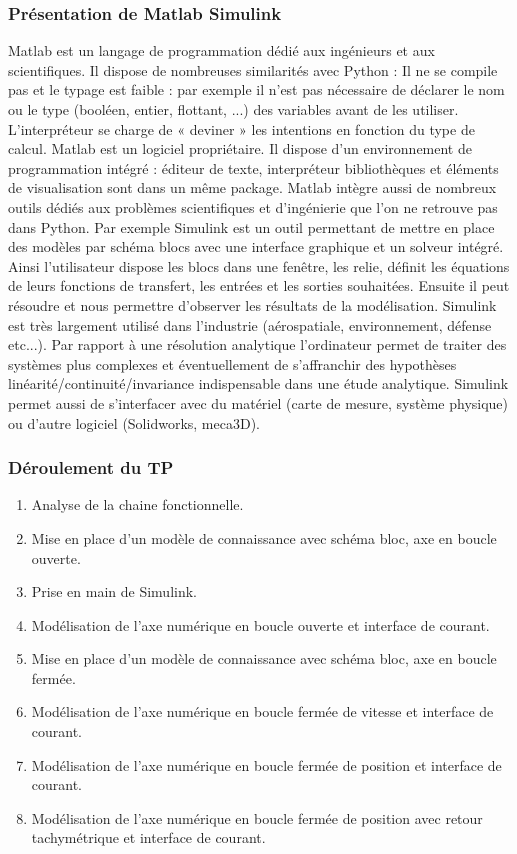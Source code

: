 \subsubsection{Présentation de Matlab Simulink}

Matlab est un langage de programmation dédié aux ingénieurs et aux scientifiques. Il dispose de nombreuses similarités avec Python : Il ne se compile pas et le typage est faible : par exemple il n'est pas nécessaire de déclarer le nom ou le type (booléen, entier, flottant, ...) des variables avant de les utiliser. L'interpréteur se charge de « deviner » les intentions en fonction du type de calcul. Matlab est un logiciel propriétaire. Il dispose d'un environnement de programmation intégré : éditeur de texte, interpréteur bibliothèques et éléments de visualisation sont dans un même package.
Matlab intègre aussi de nombreux outils dédiés aux problèmes scientifiques et d'ingénierie que l'on ne retrouve pas dans Python. Par exemple Simulink est un outil permettant de mettre en place des modèles par schéma blocs avec une interface graphique et un solveur intégré. Ainsi l'utilisateur dispose les blocs dans une fenêtre, les relie, définit les équations de leurs fonctions de transfert, les entrées et les sorties souhaitées. Ensuite il peut résoudre et nous permettre d'observer les résultats de la modélisation. Simulink est très largement utilisé dans l'industrie (aérospatiale, environnement, défense etc...). Par rapport à une résolution analytique l'ordinateur permet de traiter des systèmes plus complexes et éventuellement de s'affranchir des hypothèses linéarité/continuité/invariance indispensable dans une étude analytique. Simulink permet aussi de s'interfacer avec du matériel (carte de mesure, système physique) ou d'autre logiciel (Solidworks, meca3D).

\subsubsection{Déroulement du TP}

\begin{enumerate}
\item	Analyse de la chaine fonctionnelle.
\item Mise en place d'un modèle de connaissance avec schéma bloc, axe en boucle ouverte.
\item Prise en main de Simulink.
\item Modélisation de l'axe numérique en boucle ouverte et interface de courant.
\item Mise en place d'un modèle de connaissance avec schéma bloc, axe en boucle fermée.
\item Modélisation de l'axe numérique en boucle fermée de vitesse et interface de courant.
\item Modélisation de l'axe numérique en boucle fermée de position et interface de courant.
\item Modélisation de l'axe numérique en boucle fermée de position avec retour tachymétrique et interface de courant.
\end{enumerate}

